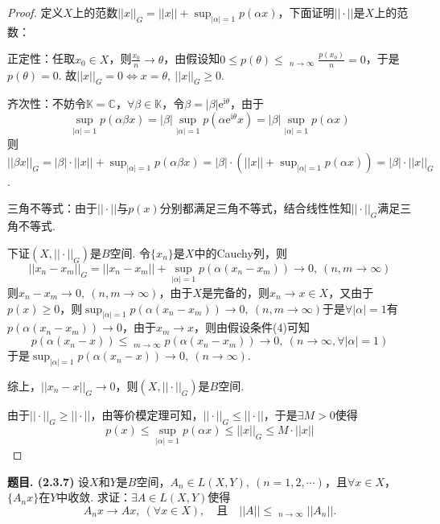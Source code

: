 \documentclass[12pt, a4paper, oneside]{ctexart}
\newcounter{problem}  %
\newenvironment{problem}[1][]{\stepcounter{problem}\par\noindent\textbf{题目\arabic{problem}. #1}}{\smallskip\par}
\DeclareMathOperator*\lowlim{\underline{lim}} %
\let\leq=\leqslant %
\let\geq=\geqslant %
\def\C{\mathbb{C}}          %
\def\K{\mathbb{K}}          %
\def\e{\mathrm{e}}          %
\def\i{\mathrm{i}}          %
\begin{document}
\begin{proof}
    定义$X$上的范数$||x||_G = ||x||+\sup_{|\alpha| = 1}p(\alpha x)$，下面证明$||\cdot ||$是$X$上的范数：
    
    \noindent 正定性：任取$x_0\in X$，则$\frac{x_0}{n}\to \theta$，由假设知$0\leq p(\theta)\leq \lowlim_{n\to\infty}\frac{p(x_0)}{n} = 0$，于是$p(\theta) = 0$. 故$||x||_G = 0\iff x = \theta,\ ||x||_G\geq 0$.

    \noindent 齐次性：不妨令$\K = \C$，$\forall \beta \in \K$，令$\beta = |\beta|\e^{\i \theta}$，由于
    \begin{equation*}
        \sup_{|\alpha| = 1}p(\alpha\beta x) = |\beta|\sup_{|\alpha|=1}p(\alpha\e^{\i\theta}x) = |\beta|\sup_{|\alpha|=1}p(\alpha x)
    \end{equation*}
    则$||\beta x||_G = |\beta|\cdot ||x|| + \sup_{|\alpha|=1}p(\alpha\beta x) = |\beta|\cdot (||x||+\sup_{|\alpha|=1}p(\alpha x)) = |\beta|\cdot ||x||_G$.

    \noindent 三角不等式：由于$||\cdot ||$与$p(x)$分别都满足三角不等式，结合线性性知$||\cdot||_G$满足三角不等式.

    下证$(X,||\cdot||_G)$是$B$空间. 令$\{x_n\}$是$X$中的Cauchy列，则
    \begin{equation*}
        ||x_n-x_m||_G = ||x_n-x_m||+\sup_{|\alpha|=1}p(\alpha(x_n-x_m))\to 0,\ (n,m\to\infty)
    \end{equation*}
    则$x_n-x_m\to 0,\ (n,m\to\infty)$，由于$X$是完备的，则$x_n\to x\in X$，又由于$p(x)\geq 0$，则$\sup_{|\alpha|=1}p(\alpha(x_n-x_m))\to 0,\ (n,m\to\infty)$于是$\forall |\alpha| = 1$有$p(\alpha(x_n-x_m))\to 0$，由于$x_m\to x$，则由假设条件(4)可知
    \begin{equation*}
        p(\alpha(x_n-x))\leq \lowlim_{m\to\infty}p(\alpha(x_n-x_m))\to 0,\ (n\to\infty,\forall |\alpha|=1)
    \end{equation*}
    于是$\sup_{|\alpha|=1}p(\alpha(x_n-x))\to 0,\ (n\to\infty)$.

    综上，$||x_n-x||_G\to 0$，则$(X,||\cdot||_G)$是$B$空间.

    由于$||\cdot||_G\geq ||\cdot||$，由等价模定理可知，$||\cdot||_G\leq ||\cdot||$，于是$\exists M > 0$使得
    \begin{equation*}
        p(x)\leq \sup_{|\alpha|=1}p(\alpha x)\leq ||x||_G\leq M\cdot ||x||
    \end{equation*}
\end{proof}
\begin{problem}[(2.3.7)]
    设$X$和$Y$是$B$空间，$A_n\in L(X,Y),\ (n=1,2,\cdots)$，且$\forall x\in X$，$\{A_nx\}$在$Y$中收敛. 求证：$\exists A\in L(X,Y)$使得
    \begin{equation*}
        A_nx\to Ax,\ (\forall x\in X),\quad \text{且}\quad ||A||\leq \lowlim_{n\to\infty}||A_n||.
    \end{equation*}
\end{problem}
\end{document}
